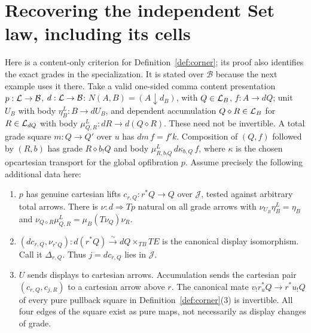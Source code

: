\documentclass[11pt]{article}
\theoremstyle{definition}\newtheorem{definition}[theorem]{Definition}
\newcommand{\B}{\mathcal B}\newcommand{\J}{\mathcal J}
\begin{document}
\section{Recovering the independent Set law, including its cells}\label{sec:set}
Here is a content-only criterion for Definition~\ref{def:corner}; its
proof also identifies the exact grades in the specialization. It is
stated over $\B$ because the next example uses it there. Take a valid
one-sided comma content presentation $p:\Lcat\to\B$, $d:\Lcat\to\B$:
$N(A,B)=(A\downarrow d_B)$, with $Q\in\mathcal L_B$, $f:A\to dQ$;
unit $U_B$ with body $\eta^L_B:B\to dU_B$, and dependent accumulation
$Q\diamond R\in\mathcal L_B$ for $R\in\mathcal L_{dQ}$ with body
$\mu^L_{Q,R}:dR\to d(Q\diamond R)$. These need not be invertible.
A total grade square $m:Q\to Q'$ over $u$ has $dm\,f=f'k$.
Composition of $(Q,f)$ followed by $(R,b)$ has grade
$R\diamond b_!Q$ and body $\mu^L_{R,b_!Q}\,d\kappa_{b,Q}\,f$,
where $\kappa$ is the chosen opcartesian transport for the global
opfibration $p$. Assume precisely the following additional data here:
\begin{enumerate}
\item $p$ has genuine cartesian lifts $c_{r,Q}:r^*Q\to Q$ over $\J$,
tested against arbitrary total arrows. There is $\nu:d\Rightarrow Tp$
natural on all grade arrows with
$\nu_{U_B}\eta^L_B=\eta_B$ and
$\nu_{Q\diamond R}\mu^L_{Q,R}=\mu_B(T\nu_Q)\nu_R$.
\item $(dc_{r,Q},\nu_{r^*Q}):d(r^*Q)\xrightarrow{\sim}
dQ\times_{TB}TE$ is the canonical display isomorphism. Call it
$\Delta_{r,Q}$. Thus $j=dc_{r,Q}$ lies in $\J$.
\item $U$ sends displays to cartesian arrows. Accumulation sends the
cartesian pair $(c_{r,Q},c_{j,R})$ to a cartesian arrow above $r$.
The canonical mate $v_!r_u^*Q\to r^*u_!Q$ of every pure pullback square
in Definition~\ref{def:corner}(3) is invertible. All four edges of the
square exist as pure maps, not necessarily as display changes of grade.
\end{enumerate}
\end{document}
